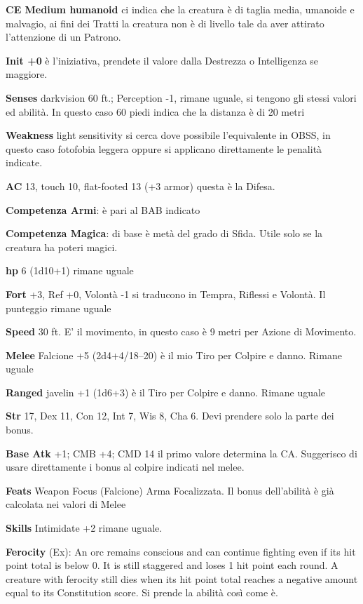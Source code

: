 \documentclass[a4paper,twoside,openany]{book}
\begin{document}
\textbf{CE Medium humanoid} ci indica che la creatura è di taglia media, umanoide e malvagio, ai fini dei Tratti la creatura non è di livello tale da aver attirato l'attenzione di un Patrono.

\textbf{Init +0} è l'iniziativa, prendete il valore dalla Destrezza o Intelligenza se maggiore.

\textbf{Senses} darkvision 60 ft.; Perception -1, rimane uguale, si tengono gli stessi valori ed abilità. In questo caso 60 piedi indica che la distanza è di 20 metri

\textbf{Weakness} light sensitivity si cerca dove possibile l'equivalente in OBSS, in questo caso fotofobia leggera oppure si applicano direttamente le penalità indicate.

\textbf{AC} 13, touch 10, flat-footed 13 (+3 armor) questa è la Difesa.

\textbf{Competenza Armi}: è pari al BAB indicato

\textbf{Competenza Magica}: di base è metà del grado di Sfida. Utile solo se la creatura ha poteri magici.

\textbf{hp} 6 (1d10+1) rimane uguale

\textbf{Fort} +3, Ref +0, Volontà -1 si traducono in Tempra, Riflessi e Volontà. Il punteggio rimane uguale

\textbf{Speed} 30 ft. E' il movimento, in questo caso è 9 metri per Azione di Movimento.

\textbf{Melee} Falcione +5 (2d4+4/18--20) è il mio Tiro per Colpire e danno. Rimane uguale

\textbf{Ranged} javelin +1 (1d6+3) è il Tiro per Colpire e danno. Rimane uguale

\textbf{Str} 17, Dex 11, Con 12, Int 7, Wis 8, Cha 6. Devi prendere solo la parte dei bonus.

\textbf{Base Atk} +1; CMB +4; CMD 14 il primo valore determina la CA. Suggerisco di usare direttamente i bonus al colpire indicati nel melee.

\textbf{Feats} Weapon Focus (Falcione) Arma Focalizzata. Il bonus dell'abilità è già calcolata nei valori di Melee

\textbf{Skills} Intimidate +2 rimane uguale.

\textbf{Ferocity} (Ex): An orc remains conscious and can continue fighting even if its hit point total is below 0. It is still staggered and loses 1 hit point each round. A creature with ferocity still dies when its hit point total reaches a negative amount equal to its Constitution score. Si prende la abilità così come è.
\end{document}
